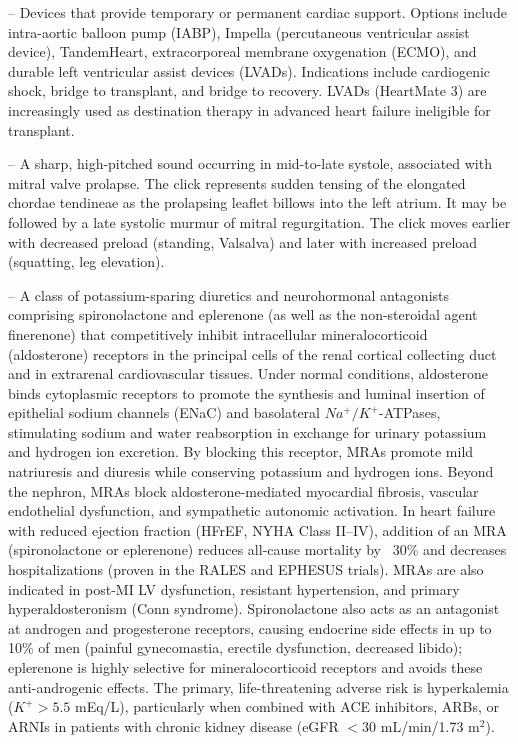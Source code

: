 -- Devices that provide temporary or permanent cardiac support. Options include intra-aortic balloon pump (IABP), Impella (percutaneous ventricular assist device), TandemHeart, extracorporeal membrane oxygenation (ECMO), and durable left ventricular assist devices (LVADs). Indications include cardiogenic shock, bridge to transplant, and bridge to recovery. LVADs (HeartMate 3) are increasingly used as destination therapy in advanced heart failure ineligible for transplant.

-- A sharp, high-pitched sound occurring in mid-to-late systole, associated with mitral valve prolapse. The click represents sudden tensing of the elongated chordae tendineae as the prolapsing leaflet billows into the left atrium. It may be followed by a late systolic murmur of mitral regurgitation. The click moves earlier with decreased preload (standing, Valsalva) and later with increased preload (squatting, leg elevation).

-- A class of potassium-sparing diuretics and neurohormonal antagonists comprising spironolactone and eplerenone (as well as the non-steroidal agent finerenone) that competitively inhibit intracellular mineralocorticoid (aldosterone) receptors in the principal cells of the renal cortical collecting duct and in extrarenal cardiovascular tissues. Under normal conditions, aldosterone binds cytoplasmic receptors to promote the synthesis and luminal insertion of epithelial sodium channels (ENaC) and basolateral $Na^+/K^+$-ATPases, stimulating sodium and water reabsorption in exchange for urinary potassium and hydrogen ion excretion. By blocking this receptor, MRAs promote mild natriuresis and diuresis while conserving potassium and hydrogen ions. Beyond the nephron, MRAs block aldosterone-mediated myocardial fibrosis, vascular endothelial dysfunction, and sympathetic autonomic activation. In heart failure with reduced ejection fraction (HFrEF, NYHA Class II--IV), addition of an MRA (spironolactone or eplerenone) reduces all-cause mortality by ~30\% and decreases hospitalizations (proven in the RALES and EPHESUS trials). MRAs are also indicated in post-MI LV dysfunction, resistant hypertension, and primary hyperaldosteronism (Conn syndrome). Spironolactone also acts as an antagonist at androgen and progesterone receptors, causing endocrine side effects in up to 10\% of men (painful gynecomastia, erectile dysfunction, decreased libido); eplerenone is highly selective for mineralocorticoid receptors and avoids these anti-androgenic effects. The primary, life-threatening adverse risk is hyperkalemia ($K^+ > 5.5$ mEq/L), particularly when combined with ACE inhibitors, ARBs, or ARNIs in patients with chronic kidney disease (eGFR $<30$ mL/min/1.73 m$^2$).

